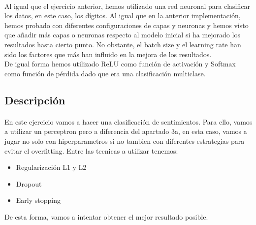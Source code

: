 \documentclass{report}
\begin{document}
        \paragraph*{}
        {
          Al igual que el ejercicio anterior, hemos utilizado una red neuronal para clasificar los datos, en este caso, los dígitos.
          Al igual que en la anterior implementación, hemos probado con diferentes configuraciones de capas y neuronas y hemos visto que añadir más capas o neuronas respecto al modelo inicial si ha mejorado los resultados hasta cierto punto.
          No obstante, el batch size y el learning rate han sido los factores que más han influido en la mejora de los resultados.\\

          De igual forma hemos utilizado ReLU como función de activación y Softmax como función de pérdida dado que era una clasificación multiclase.
        }
      \subsection*{Descripción}
        \paragraph*{}
        {
          En este ejercicio vamos a hacer una clasificación de sentimientos.
          Para ello, vamos a utilizar un perceptron pero a diferencia del apartado 3a, en esta caso, vamos a jugar no solo con hiperparametros si no tambien con diferentes estrategias para evitar el overfitting.
          Entre las tecnicas a utilizar tenemos:
          \begin{itemize}
            \item Regularización L1 y L2
            \item Dropout
            \item Early stopping
          \end{itemize}
          De esta forma, vamos a intentar obtener el mejor resultado posible.
        }
\end{document}
